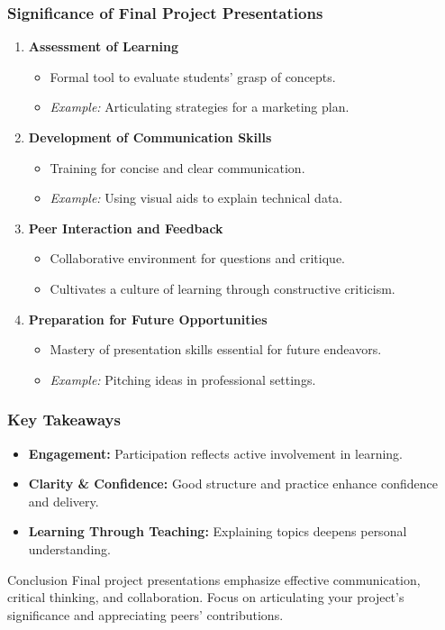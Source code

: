 \documentclass[aspectratio=169]{beamer}
\begin{document}
\begin{frame}[fragile]
    \frametitle{Significance of Final Project Presentations}
    \begin{enumerate}
        \item \textbf{Assessment of Learning}
            \begin{itemize}
                \item Formal tool to evaluate students' grasp of concepts.
                \item \textit{Example:} Articulating strategies for a marketing plan.
            \end{itemize}
        \item \textbf{Development of Communication Skills}
            \begin{itemize}
                \item Training for concise and clear communication.
                \item \textit{Example:} Using visual aids to explain technical data.
            \end{itemize}
        \item \textbf{Peer Interaction and Feedback}
            \begin{itemize}
                \item Collaborative environment for questions and critique.
                \item Cultivates a culture of learning through constructive criticism.
            \end{itemize}
        \item \textbf{Preparation for Future Opportunities}
            \begin{itemize}
                \item Mastery of presentation skills essential for future endeavors.
                \item \textit{Example:} Pitching ideas in professional settings.
            \end{itemize}
    \end{enumerate}
\end{frame}

\begin{frame}[fragile]
    \frametitle{Key Takeaways}
    \begin{itemize}
        \item \textbf{Engagement:} Participation reflects active involvement in learning.
        \item \textbf{Clarity \& Confidence:} Good structure and practice enhance confidence and delivery.
        \item \textbf{Learning Through Teaching:} Explaining topics deepens personal understanding.
    \end{itemize}
    
    \begin{block}{Conclusion}
        Final project presentations emphasize effective communication, critical thinking, and collaboration.
        Focus on articulating your project's significance and appreciating peers' contributions.
    \end{block}
\end{frame}
\end{document}
